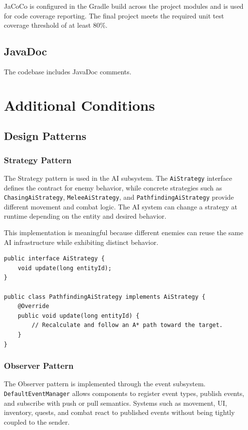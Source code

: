 \documentclass[12pt]{extarticle}
\begin{document}
JaCoCo is configured in the Gradle build across the project modules and is used for code coverage reporting. The final project meets the required unit test coverage threshold of at least 80\%.

\subsection{JavaDoc}
The codebase includes JavaDoc comments.

\section{Additional Conditions}
\subsection{Design Patterns}
\subsubsection{Strategy Pattern}
The Strategy pattern is used in the AI subsystem. The \texttt{AiStrategy} interface defines the contract for enemy behavior, while concrete strategies such as \texttt{ChasingAiStrategy}, \texttt{MeleeAiStrategy}, and \texttt{PathfindingAiStrategy} provide different movement and combat logic. The AI system can change a strategy at runtime depending on the entity and desired behavior.

This implementation is meaningful because different enemies can reuse the same AI infrastructure while exhibiting distinct behavior.





\begin{lstlisting}[caption={Strategy pattern through interchangeable AI behaviors}]
public interface AiStrategy {
    void update(long entityId);
}

public class PathfindingAiStrategy implements AiStrategy {
    @Override
    public void update(long entityId) {
        // Recalculate and follow an A* path toward the target.
    }
}
\end{lstlisting}

\subsubsection{Observer Pattern}
The Observer pattern is implemented through the event subsystem. \texttt{DefaultEventManager} allows components to register event types, publish events, and subscribe with push or pull semantics. Systems such as movement, UI, inventory, quests, and combat react to published events without being tightly coupled to the sender.
\end{document}
